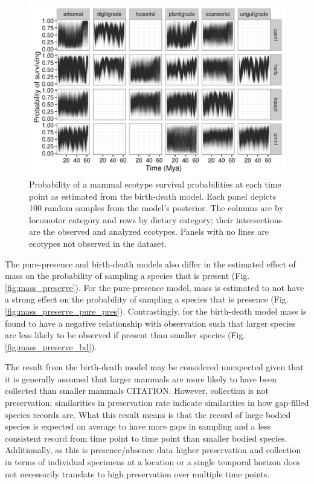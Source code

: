 \documentclass[12pt,letterpaper]{article}
\begin{document}
\begin{figure}[ht]
  \centering
  \includegraphics[width=\textwidth,height=0.4\textheight,keepaspectratio=true]{figure/ecotype_survival_bd}
  \caption[Ecotype survival probability estimated from the birth-death model]{Probability of a mammal ecotype survival probabilities at each time point as estimated from the birth-death model. Each panel depicts 100 random samples from the model's posterior. The columns are by locomotor category and rows by dietary category; their intersections are the observed and analyzed ecotypes. Panels with no lines are ecotypes not observed in the dataset.}
  \label{fig:eco_survival}
\end{figure}





The pure-presence and birth-death models also differ in the estimated effect of mass on the probability of sampling a species that is present (Fig. \ref{fig:mass_preserve}). For the pure-presence model, mass is estimated to not have a strong effect on the probability of sampling a species that is presence (Fig. \ref{fig:mass_preserve_pure_pres}). Contrastingly, for the birth-death model mass is found to have a negative relationship with observation such that larger species are less likely to be observed if present than smaller species (Fig. \ref{fig:mass_preserve_bd}). 

The result from the birth-death model may be considered unexpected given that it is generally assumed that larger mammals are more likely to have been collected than smaller mammals CITATION. However, collection is not preservation; similarities in preservation rate indicate similarities in how gap-filled species records are. What this result means is that the record of large bodied species is expected on average to have more gaps in sampling and a less consistent record from time point to time point than smaller bodied species. Additionally, as this is presence/absence data higher preservation and collection in terms of individual specimens at a location or a single temporal horizon does not necessarily translate to high preservation over multiple time points.
\end{document}

